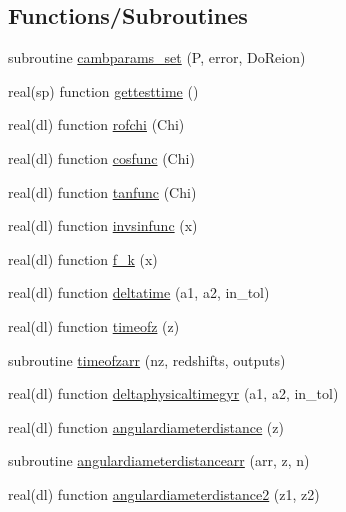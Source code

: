 \subsection*{Functions/\+Subroutines}
\begin{DoxyCompactItemize}
\item 
subroutine \mbox{\hyperlink{namespacemodelparams_a13f805ae3c4213f4c9204bf8d8f17350}{cambparams\+\_\+set}} (P, error, Do\+Reion)
\item 
real(sp) function \mbox{\hyperlink{namespacemodelparams_a2abd5cb7bfc9c34a736d91ed5863552d}{gettesttime}} ()
\item 
real(dl) function \mbox{\hyperlink{namespacemodelparams_a09b856ca78d2c38cb9746680ce7a4d9f}{rofchi}} (Chi)
\item 
real(dl) function \mbox{\hyperlink{namespacemodelparams_af941ff2f9683e6bf6994f87b27ea9427}{cosfunc}} (Chi)
\item 
real(dl) function \mbox{\hyperlink{namespacemodelparams_ade19d5a5ee3bef508e781d64c8c667ae}{tanfunc}} (Chi)
\item 
real(dl) function \mbox{\hyperlink{namespacemodelparams_a463f6e148b9f2c45ec30cb28c29bb4e3}{invsinfunc}} (x)
\item 
real(dl) function \mbox{\hyperlink{namespacemodelparams_ad0ec1bb07f7e0295749e801b141bfc0f}{f\+\_\+k}} (x)
\item 
real(dl) function \mbox{\hyperlink{namespacemodelparams_ae583f09e6523f430605f421d2db537ae}{deltatime}} (a1, a2, in\+\_\+tol)
\item 
real(dl) function \mbox{\hyperlink{namespacemodelparams_ae8f7910867e2ed755e7f4d5eacdeee2d}{timeofz}} (z)
\item 
subroutine \mbox{\hyperlink{namespacemodelparams_aa9fc9f952c72345785fa69b491e598d5}{timeofzarr}} (nz, redshifts, outputs)
\item 
real(dl) function \mbox{\hyperlink{namespacemodelparams_ac094d31babe3489387c12a3c2ab05549}{deltaphysicaltimegyr}} (a1, a2, in\+\_\+tol)
\item 
real(dl) function \mbox{\hyperlink{namespacemodelparams_a63c764e54b9b02649d00f8071cb9297f}{angulardiameterdistance}} (z)
\item 
subroutine \mbox{\hyperlink{namespacemodelparams_a31cf59c4ca59e0bc5c8c2b45a8f3487e}{angulardiameterdistancearr}} (arr, z, n)
\item 
real(dl) function \mbox{\hyperlink{namespacemodelparams_a74645c7e2e48bb3d57da7da5383799ed}{angulardiameterdistance2}} (z1, z2)
\item 

\end{DoxyCompactItemize}
